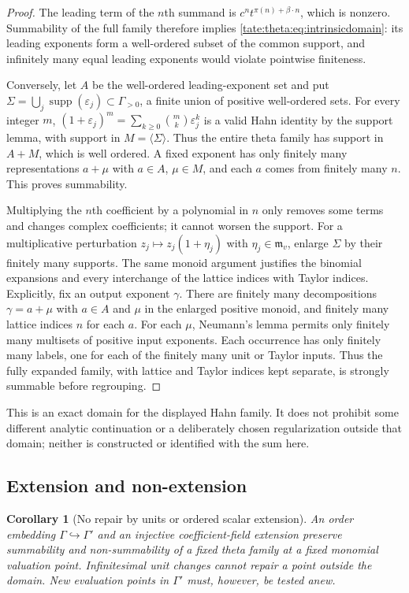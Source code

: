 \documentclass[11pt,letterpaper]{article}
\newtheorem{corollary}[corollary]{Corollary}
\theoremstyle{definition}
\newcommand{\supp}{\operatorname{supp}}
\newcommand{\m}{\mathfrak m}
\begin{document}
\begin{proof}
The leading term of the $n$th summand is $c^nt^{\pi(n)+\beta\cdot n}$,
which is nonzero. Summability of the full family therefore implies
\eqref{tate:theta:eq:intrinsicdomain}: its leading exponents form a
well-ordered subset of the common support, and infinitely many equal
leading exponents would violate pointwise finiteness.

Conversely, let $A$ be the well-ordered leading-exponent set and put
$\Sigma=\bigcup_j\supp(\varepsilon_j)\subset\Gamma_{>0}$, a finite union of
positive well-ordered sets. For every integer $m$,
$(1+\varepsilon_j)^m=\sum_{k\ge0}\binom mk\varepsilon_j^k$ is a valid Hahn
identity by the support lemma, with support in $M=\langle\Sigma\rangle$.
Thus the entire theta family has support in $A+M$, which is well ordered.
A fixed exponent has only finitely many representations $a+\mu$ with
$a\in A$, $\mu\in M$, and each $a$ comes from finitely many $n$. This
proves summability.

Multiplying the $n$th coefficient by a polynomial in $n$ only removes some
terms and changes complex coefficients; it cannot worsen the support. For a
multiplicative perturbation $z_j\mapsto z_j(1+\eta_j)$ with $\eta_j\in\m_v$,
enlarge $\Sigma$ by their finitely many supports. The same monoid argument
justifies the binomial expansions and every interchange of the lattice
indices with Taylor indices. Explicitly, fix an output exponent $\gamma$.
There are finitely many decompositions $\gamma=a+\mu$ with $a\in A$ and
$\mu$ in the enlarged positive monoid, and finitely many lattice indices
$n$ for each $a$. For each $\mu$, Neumann's lemma permits only finitely
many multisets of positive input exponents. Each occurrence has only
finitely many labels, one for each of the finitely many unit or Taylor
inputs. Thus the fully expanded family, with lattice and Taylor indices
kept separate, is strongly summable before regrouping.
\end{proof}

This is an exact domain for the displayed Hahn family. It does not prohibit
some different analytic continuation or a deliberately chosen
regularization outside that domain; neither is constructed or identified
with the sum here.

\subsection{Extension and non-extension}

\begin{corollary}[No repair by units or ordered scalar extension]\label{tate:theta:cor:norepair}
An order embedding $\Gamma\hookrightarrow\Gamma'$ and an injective
coefficient-field extension preserve summability and non-summability of a
fixed theta family at a fixed monomial valuation point. Infinitesimal unit
changes cannot repair a point outside the domain. New evaluation points in
$\Gamma'$ must, however, be tested anew.
\end{corollary}
\end{document}
